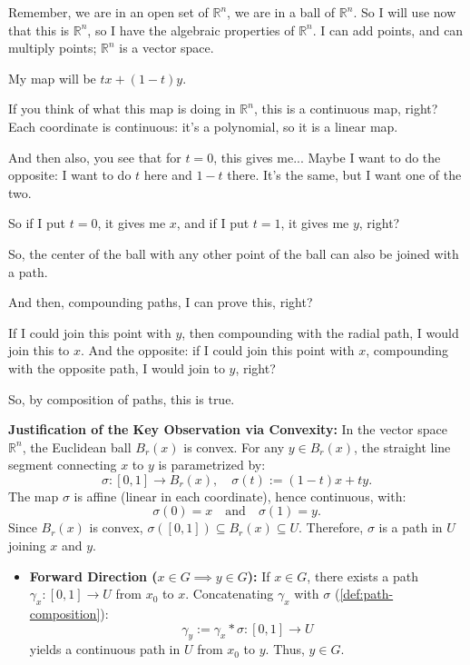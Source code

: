 \begin{proofWrapper}
\begin{speech}[01:08:17 - 01:10:27]
Remember, we are in an open set of $\mathbb{R}^n$, we are in a ball of $\mathbb{R}^n$. So I will use now that this is $\mathbb{R}^n$, so I have the algebraic properties of $\mathbb{R}^n$. I can add points, and can multiply points; $\mathbb{R}^n$ is a vector space.

My map will be $t x + (1-t) y$.

If you think of what this map is doing in $\mathbb{R}^n$, this is a continuous map, right? Each coordinate is continuous: it's a polynomial, so it is a linear map.

And then also, you see that for $t = 0$, this gives me... Maybe I want to do the opposite: I want to do $t$ here and $1-t$ there. It's the same, but I want one of the two.


So if I put $t = 0$, it gives me $x$, and if I put $t = 1$, it gives me $y$, right?

So, the center of the ball with any other point of the ball can also be joined with a path.

And then, compounding paths, I can prove this, right?

If I could join this point with $y$, then compounding with the radial path, I would join this to $x$. And the opposite: if I could join this point with $x$, compounding with the opposite path, I would join to $y$, right?

So, by composition of paths, this is true.
\end{speech}

\begin{content}
\textbf{Justification of the Key Observation via Convexity:}
In the vector space $\mathbb{R}^n$, the Euclidean ball $B_r(x)$ is convex. For any $y \in B_r(x)$, the straight line segment connecting $x$ to $y$ is parametrized by:
\begin{equation}\label{eq:segment-path}
\sigma \colon [0, 1] \to B_r(x), \quad \sigma(t) := (1 - t)x + ty.
\end{equation}
The map $\sigma$ is affine (linear in each coordinate), hence continuous, with:
\[
\sigma(0) = x \quad \text{and} \quad \sigma(1) = y.
\]
Since $B_r(x)$ is convex, $\sigma([0, 1]) \subseteq B_r(x) \subseteq U$. Therefore, $\sigma$ is a path in $U$ joining $x$ and $y$.

\begin{itemize}
    \item \textbf{Forward Direction ($x \in G \implies y \in G$):}
    If $x \in G$, there exists a path $\gamma_x \colon [0, 1] \to U$ from $x_0$ to $x$. Concatenating $\gamma_x$ with $\sigma$ (\cref{def:path-composition}):
    \[
    \gamma_y := \gamma_x * \sigma \colon [0, 1] \to U
    \]
    yields a continuous path in $U$ from $x_0$ to $y$. Thus, $y \in G$.


\end{itemize}
\end{content}
\end{proofWrapper}
